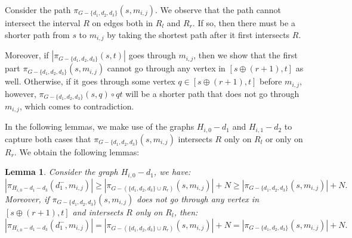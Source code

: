 \documentclass[11pt]{article}
\theoremstyle{plain}
\newtheorem{lemma}[theorem]{Lemma}
\theoremstyle{definition}
\newcommand{\set}[1]{\{ #1 \}}
\newcommand{\og}[3]{\pi_{G-#3}\left(#1,#2\right)}
\begin{document}
Consider the path $\og{s}{m_{i,j}}{\set{d_1, d_2, d_3}}$. We observe that the path cannot intersect the interval $R$ on edges both in $R_l$ and $R_r$. If so, then there must be a shorter path from $s$ to $m_{i,j}$ by taking the shortest path after it first intersects $R$. 

Moreover, if $|\og{s}{t}{\set{d_1, d_2, d_3}}|$ goes through $m_{i,j}$, then we show that the first part $\og{s}{m_{i,j}}{\set{d_1, d_2, d_3}}$ cannot go through any vertex in $[s \oplus (r+1),t]$ as well. Otherwise, if it goes through some vertex $q \in [s \oplus (r+1),t]$ before $m_{i,j}$, however, $\og{s}{q}{\set{d_1, d_2, d_3}} \circ qt$ will be a shorter path that does not go through $m_{i,j}$, which comes to contradiction.

In the following lemmas, we make use of the graphs $H_{i,0}-d_1$ and $H_{i,1}-d_2$ to capture both cases that $\og{s}{m_{i,j}}{\set{d_1, d_2, d_3}}$ intersects $R$ only on $R_l$ or only on $R_r$. We obtain the following lemmas:

\begin{lemma}\label{lemma:smcase1}
    Consider the graph $H_{i,0}-d_1$, we have:
    \[|\pi_{H_{i,0}-d_1-d_3}(d_1^-,m_{i,j})| \geq |\og{s}{m_{i,j}}{(\set{d_1, d_2, d_3} \cup R_r)}| + N \geq |\og{s}{m_{i,j}}{\set{d_1, d_2, d_3}}| + N.\]
    Moreover, if $\og{s}{m_{i,j}}{\set{d_1, d_2, d_3}}$ does not go through any vertex in $[s \oplus (r+1),t]$ and intersects $R$ only on $R_l$, then:
    \[|\pi_{H_{i,0}-d_1-d_3}(d_1^-,m_{i,j})| = |\og{s}{m_{i,j}}{(\set{d_1, d_2, d_3} \cup R_r)}| + N = |\og{s}{m_{i,j}}{\set{d_1, d_2, d_3}}| + N.\]
\end{lemma}

\begin{center}
    


 \end{center}
\end{document}
